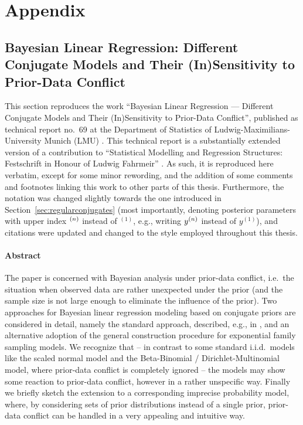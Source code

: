 \chapter{Appendix}


\section{Bayesian Linear Regression: Different Conjugate Models and Their (In)Sensi\-ti\-vi\-ty to Prior-Data Conflict}
\label{sec:festschrift}

This section reproduces the work
``Bayesian Linear Regression --- Different Conjugate Models and Their (In)Sensitivity to Prior-Data Conflict'',
published as technical report no.~69 at the Department of Statistics of Ludwig-Maximilians-University Munich (LMU)
\parencite{Walter2009b}. This technical report is a substantially extended version of a contribution to
``Statistical Modelling and Regression Structures: Festschrift in Honour of Ludwig Fahrmeir'' \parencite{Walter2010a}.
As such, it is reproduced here verbatim, except for some minor rewording,
and the addition of some comments and footnotes linking this work to other parts of this thesis.
Furthermore, the notation was changed slightly towards the one introduced in Section~\ref{sec:regularconjugates}
(most importantly, denoting posterior parameters with upper index ${}^{(n)}$ instead of ${}^{(1)}$,
e.g., writing $y^{(n)}$ instead of $y^{(1)}$),
and citations were updated and changed to the style employed throughout this thesis.

\subsubsection*{Abstract}

The paper is concerned with Bayesian analysis under
prior-data conflict, i.e.\ the situation when observed data are
rather unexpected under the prior (and the sample size is not large
enough to eliminate the influence of the prior). Two approaches for
Bayesian linear regression modeling based on conjugate priors are
considered in detail, namely the standard approach, described, e.g., in
\textcite{2013:fahrmeier-kneib-lang-marx}, and an alternative adoption of the
general construction procedure for exponential family sampling
models. We recognize that -- in contrast to some standard i.i.d.\
models like the scaled normal model and the Beta-Binomial /
Dirichlet-Multinomial model, where prior-data conflict is completely
ignored -- the models may show some reaction to prior-data conflict,
however in a rather unspecific way. Finally we briefly sketch the
extension to a corresponding imprecise probability model, where,
by considering sets of prior distributions instead of a single prior,
prior-data conflict can be handled in a very appealing and intuitive way.


